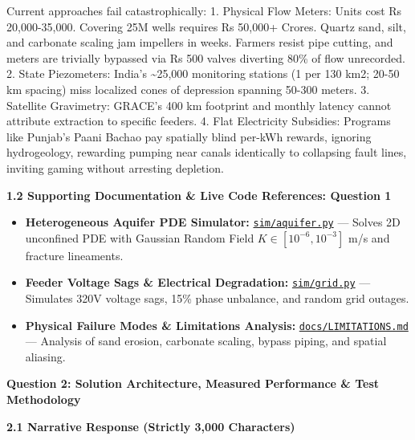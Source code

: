 \documentclass[10pt,a4paper]{article}
\begin{document}
Current approaches fail catastrophically:
1. Physical Flow Meters: Units cost Rs 20,000-35,000. Covering 25M wells requires Rs 50,000+ Crores. Quartz sand, silt, and carbonate scaling jam impellers in weeks. Farmers resist pipe cutting, and meters are trivially bypassed via Rs 500 valves diverting 80\% of flow unrecorded.
2. State Piezometers: India's \~{}25,000 monitoring stations (1 per 130 km2; 20-50 km spacing) miss localized cones of depression spanning 50-300 meters.
3. Satellite Gravimetry: GRACE's 400 km footprint and monthly latency cannot attribute extraction to specific feeders.
4. Flat Electricity Subsidies: Programs like Punjab's Paani Bachao pay spatially blind per-kWh rewards, ignoring hydrogeology, rewarding pumping near canals identically to collapsing fault lines, inviting gaming without arresting depletion.

{\small \textbf{\color{secondary}1.2 Supporting Documentation \& Live Code References: Question 1}}
\begin{itemize}[leftmargin=1.5em, itemsep=1pt]
    \item \textbf{Heterogeneous Aquifer PDE Simulator:} \href{https://github.com/HirthikBalaji/AquiPulse/blob/main/sim/aquifer.py}{\texttt{sim/aquifer.py}} --- Solves 2D unconfined PDE with Gaussian Random Field $K \in [10^{-6}, 10^{-3}]$ m/s and fracture lineaments.
    \item \textbf{Feeder Voltage Sags \& Electrical Degradation:} \href{https://github.com/HirthikBalaji/AquiPulse/blob/main/sim/grid.py}{\texttt{sim/grid.py}} --- Simulates 320V voltage sags, 15\% phase unbalance, and random grid outages.
    \item \textbf{Physical Failure Modes \& Limitations Analysis:} \href{https://github.com/HirthikBalaji/AquiPulse/blob/main/docs/LIMITATIONS.md}{\texttt{docs/LIMITATIONS.md}} --- Analysis of sand erosion, carbonate scaling, bypass piping, and spatial aliasing.
\end{itemize}

\newpage

{\large \textbf{\color{primary}Question 2: Solution Architecture, Measured Performance \& Test Methodology}}
\vspace{0.1em}

{\small \textbf{\color{secondary}2.1 Narrative Response (Strictly 3,000 Characters)}}
\end{document}
